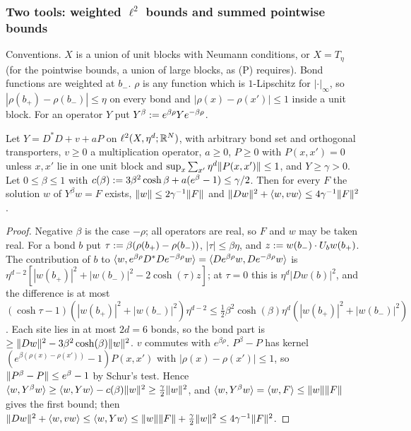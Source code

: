 
\subsubsection{Two tools: weighted $\ell^2$ bounds and summed pointwise bounds}\label{sup1:ssec:WK}

Conventions. $X$ is a union of unit blocks with Neumann conditions, or $X=T_\eta$ (for the pointwise bounds, a union of large blocks, as (P) requires). Bond functions are weighted at $b_-$. $\rho$ is any function which is $1$-Lipschitz for $|\cdot|_\infty$, so $|\rho(b_+)-\rho(b_-)|\le\eta$ on every bond and $|\rho(x)-\rho(x')|\le1$ inside a unit block. For an operator $Y$ put $Y^\beta:= e^{\beta\rho}Ye^{-\beta\rho}$.

\begin{lemma}\label{sup1:lem:W1}
Let $Y=D^*D+v+aP$ on $\ell^2(X,\eta^d;\mathbb R^N)$, with arbitrary bond set and orthogonal transporters, $v\ge0$ a multiplication operator, $a\ge0$, $P\ge0$ with $P(x,x')=0$ unless $x,x'$ lie in one unit block and $\sup_x\sum_{x'}\eta^d\lVert P(x,x')\rVert\le1$, and $Y\ge\gamma>0$. Let $0\le\beta\le1$ with $c(\beta):=3\beta^2\cosh\beta+a(e^\beta-1)\le\gamma/2$. Then for every $F$ the solution $w$ of $Y^\beta w=F$ exists, $\lVert w\rVert\le2\gamma^{-1}\lVert F\rVert$ and $\lVert Dw\rVert^2+\langle w,vw\rangle\le4\gamma^{-1}\lVert F\rVert^2$.
\end{lemma}

\begin{proof}
Negative $\beta$ is the case $-\rho$; all operators are real, so $F$ and $w$ may be taken real. For a bond $b$ put $\tau:=\beta(\rho(b_+)-\rho(b_-))$, $|\tau|\le\beta\eta$, and $z:= w(b_-)\cdot U_bw(b_+)$. The contribution of $b$ to $\langle w,e^{\beta\rho}D^*De^{-\beta\rho}w\rangle=\langle De^{\beta\rho}w,De^{-\beta\rho}w\rangle$ is $\eta^{d-2}[|w(b_+)|^2+|w(b_-)|^2-2\cosh(\tau)z]$; at $\tau=0$ this is $\eta^d|Dw(b)|^2$, and the difference is at most $(\cosh\tau-1)(|w(b_+)|^2+|w(b_-)|^2)\eta^{d-2}\le\frac12\beta^2\cosh(\beta)\eta^d(|w(b_+)|^2+|w(b_-)|^2)$. Each site lies in at most $2d=6$ bonds, so the bond part is $\ge\lVert Dw\rVert^2-3\beta^2\cosh(\beta)\lVert w\rVert^2$. $v$ commutes with $e^{\beta\rho}$. $P^\beta-P$ has kernel $(e^{\beta(\rho(x)-\rho(x'))}-1)P(x,x')$ with $|\rho(x)-\rho(x')|\le1$, so $\lVert P^\beta-P\rVert\le e^\beta-1$ by Schur's test. Hence $\langle w,Y^\beta w\rangle\ge\langle w,Yw\rangle-c(\beta)\lVert w\rVert^2\ge\frac\gamma2\lVert w\rVert^2$, and $\langle w,Y^\beta w\rangle=\langle w,F\rangle\le\lVert w\rVert\lVert F\rVert$ gives the first bound; then $\lVert Dw\rVert^2+\langle w,vw\rangle\le\langle w,Yw\rangle\le\lVert w\rVert\lVert F\rVert+\frac\gamma2\lVert w\rVert^2\le4\gamma^{-1}\lVert F\rVert^2$.
\end{proof}

